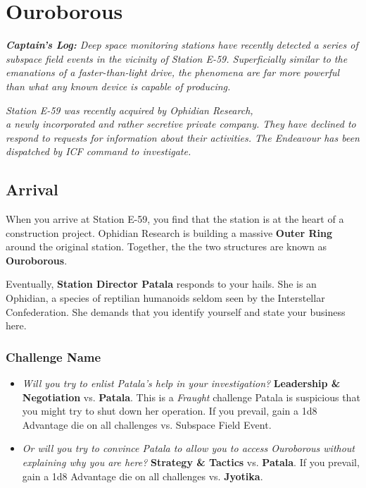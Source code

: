 \documentclass[11pt, a5paper, parskip=half-, DIV=12]{scrartcl}
\begin{document}
\section*{Ouroborous}
\textit{\textbf{Captain's Log:} Deep space monitoring stations have recently detected a series of subspace field events in the vicinity of Station E-59. Superficially similar to the emanations of a faster-than-light drive, the phenomena are far more powerful than what any known device is capable of producing.}

\textit{Station E-59 was recently acquired by Ophidian Research, \\a newly incorporated \textemdash{} and rather secretive \textemdash{} private company. They have declined to respond to requests for information about their activities. The Endeavour has been dispatched by ICF command to investigate.}

\subsection*{Arrival}
When you arrive at Station E-59, you find that the station is at the heart of a construction project.  Ophidian Research is building a massive \textbf{Outer Ring} around the original station. Together, the the two structures are known as \textbf{Ouroborous}.

Eventually, \textbf{Station Director Patala} responds to your hails. She is an Ophidian, a species of reptilian humanoids seldom seen by the Interstellar Confederation. She demands that you identify yourself and state your business here.

\subsubsection*{Challenge Name}
\begin{itemize}
	\item \textit{Will you try to enlist Patala's help in your investigation?} \textbf{Leadership \& Negotiation} vs. \textbf{Patala}. This is a \textit{Fraught} challenge \textemdash{} Patala is suspicious that you might try to shut down her operation. If you prevail, gain a 1d8 Advantage die on all challenges vs. Subspace Field Event.
	\item \textit{Or will you try to convince Patala to allow you to access Ouroborous without explaining why you are here?} \textbf{Strategy \& Tactics} vs. \textbf{Patala}. If you prevail, gain a 1d8 Advantage die on all challenges vs. \textbf{Jyotika}.  
\end{itemize}
\end{document}

